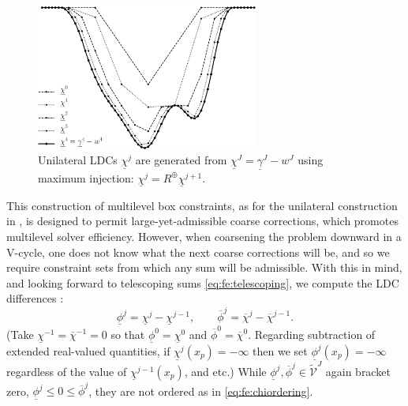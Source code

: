 \documentclass[letterpaper,final,12pt,reqno]{amsart}
\theoremstyle{cstyle}
\theoremstyle{cstyle*}
\theoremstyle{dstyle}
\numberwithin{equation}{section}
\numberwithin{figure}{section}
\numberwithin{table}{section}
\numberwithin{theorem}{section}
\newcommand{\maxR}{R^{\bm{\oplus}}}
\begin{document}
\begin{figure}[ht]
\includegraphics[width=0.65\textwidth]{fixfigs/chiphilevels.pdf}
\caption{Unilateral LDCs $\underline{\chi}^j$ are generated from $\underline{\chi}^J = \underline{\gamma}^J - w^J$ using maximum injection: $\underline{\chi}^j = \maxR \underline{\chi}^{j+1}$.}
\label{fig:chiphilevels}
\end{figure}

This construction of multilevel box constraints, as for the unilateral construction in \cite{GraeserKornhuber2009}, is designed to permit large-yet-admissible coarse corrections, which promotes multilevel solver efficiency.  However, when coarsening the problem downward in a V-cycle, one does not know what the next coarse corrections will be, and so we require constraint sets from which any sum will be admissible.  With this in mind, and looking forward to telescoping sums \eqref{eq:fe:telescoping}, we compute the LDC differences \cite{GraeserKornhuber2009}:
\begin{equation}
\underline{\phi}^j = \underline{\chi}^j - \underline{\chi}^{j-1}, \qquad \overline{\phi}^j = \overline{\chi}^j - \overline{\chi}^{j-1}.  \label{eq:fe:philevels}
\end{equation}
(Take $\underline{\chi}^{-1}=\overline{\chi}^{-1}=0$ so that $\underline{\phi}^0=\underline{\chi}^0$ and $\overline{\phi}^0=\overline{\chi}^0$.  Regarding subtraction of extended real-valued quantities, if $\underline{\chi}^j(x_p)=-\infty$ then we set $\underline{\phi}^j(x_p)=-\infty$ regardless of the value of $\underline{\chi}^{j-1}(x_p)$, and etc.)  While $\underline{\phi}^{j},\overline{\phi}^{j} \in \tilde{\mathcal{V}}^J$ again bracket zero, $\underline{\phi}^j \le 0 \le \overline{\phi}^j$, they are not ordered as in \eqref{eq:fe:chiordering}.
\end{document}
